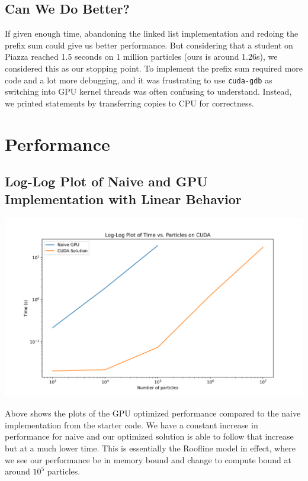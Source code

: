 \documentclass{article}
\begin{document}
\subsection{Can We Do Better?}
If given enough time, abandoning the linked list implementation and redoing the prefix sum could give us better performance. But considering that a student on Piazza reached 1.5 seconds on 1 million particles (ours is around 1.26s), we considered this as our stopping point. To implement the prefix sum required more code and a lot more debugging, and it was frustrating to use \verb|cuda-gdb| as switching into GPU kernel threads was often confusing to understand. Instead, we printed statements by transferring copies to CPU for correctness.

\section{Performance}

\subsection{Log-Log Plot of Naive and GPU Implementation with Linear Behavior}
\centerline{\includegraphics[width=6in]{figures/log-log.png}}

Above shows the plots of the GPU optimized performance compared to the naive implementation from the starter code. We have a constant increase in performance for naive and our optimized solution is able to follow that increase but at a much lower time. This is essentially the Roofline model in effect, where we see our performance be in memory bound and change to compute bound at around $10^5$ particles.
\end{document}
